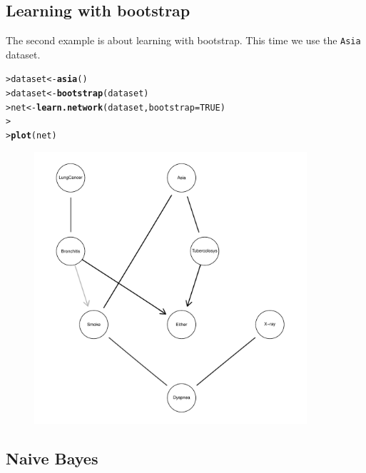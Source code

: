 \documentclass{article}\usepackage[]{graphicx}\usepackage[]{color}
\makeatletter
\newcommand{\hlnum}[1]{\textcolor[rgb]{0.686,0.059,0.569}{#1}}%
\newcommand{\hlstd}[1]{\textcolor[rgb]{0.345,0.345,0.345}{#1}}%
\newcommand{\hlkwb}[1]{\textcolor[rgb]{0.69,0.353,0.396}{#1}}%
\newcommand{\hlkwc}[1]{\textcolor[rgb]{0.333,0.667,0.333}{#1}}%
\newcommand{\hlkwd}[1]{\textcolor[rgb]{0.737,0.353,0.396}{\textbf{#1}}}%
\newenvironment{kframe}{%
 \def\at@end@of@kframe{}%
 \ifinner\ifhmode%
  \def\at@end@of@kframe{\end{minipage}}%
  \begin{minipage}{\columnwidth}%
 \fi\fi%
 \def\FrameCommand##1{\hskip\@totalleftmargin \hskip-\fboxsep
 \colorbox{shadecolor}{##1}\hskip-\fboxsep
     \hskip-\linewidth \hskip-\@totalleftmargin \hskip\columnwidth}%
 \MakeFramed {\advance\hsize-\width
   \@totalleftmargin\z@ \linewidth\hsize
   \@setminipage}}%
 {\par\unskip\endMakeFramed%
 \at@end@of@kframe}
\newenvironment{knitrout}{}{} %
\makeatother
\begin{document}
\subsection{Learning with bootstrap}
The second example is about learning with bootstrap. This time we use the \texttt{Asia} dataset.

\begin{knitrout}
\color{fgcolor}\begin{kframe}
\begin{alltt}
\hlstd{> }\hlstd{dataset} \hlkwb{<-} \hlkwd{asia}\hlstd{()}
\hlstd{> }\hlstd{dataset} \hlkwb{<-} \hlkwd{bootstrap}\hlstd{(dataset)}
\hlstd{> }\hlstd{net} \hlkwb{<-} \hlkwd{learn.network}\hlstd{(dataset,} \hlkwc{bootstrap} \hlstd{=} \hlnum{TRUE}\hlstd{)}
\hlstd{> }
\hlstd{> }\hlkwd{plot}\hlstd{(net)}
\end{alltt}
\end{kframe}
\end{knitrout}
\begin{figure}[!h]%
\centerline{\includegraphics[width=0.9\textwidth]{asiatest-1.pdf}}
\end{figure}

\subsection{Naive Bayes}\label{sec:naivebayes}
\end{document}
